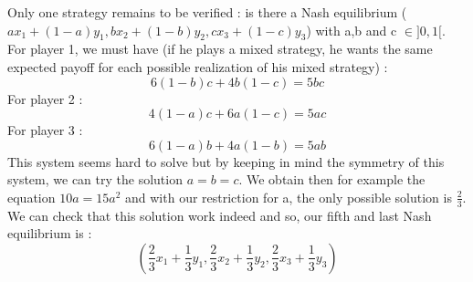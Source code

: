 Only one strategy remains to be verified : is there a Nash equilibrium ($ ax_1 + (1-a)y_1, b x_2 + (1-b)y_2, c x_3 + (1-c)y_3 $) 
with a,b and c $\in ]0,1[$.\\
For player 1, we must have (if he plays a mixed strategy, he wants the same expected payoff for each possible realization of his mixed strategy) :
$$ 6(1-b)c + 4b(1-c) = 5bc $$
For player 2 : 
$$ 4(1-a)c + 6a(1-c) = 5ac $$
For player 3 :
$$ 6(1-a)b + 4a(1-b) = 5ab $$
This system seems hard to solve but by keeping in mind the symmetry of this system, we can try the solution $ a = b = c $. 
We obtain then for example the equation $ 10a = 15 a^2 $ and with our restriction for a, the only possible solution is $\frac{2}{3} $.
We can check that this solution work indeed and so, our fifth and last Nash equilibrium is :
$$ (\frac{2}{3} x_1 + \frac{1}{3} y_1, \frac{2}{3} x_2 + \frac{1}{3} y_2, \frac{2}{3} x_3 + \frac{1}{3} y_3) $$




